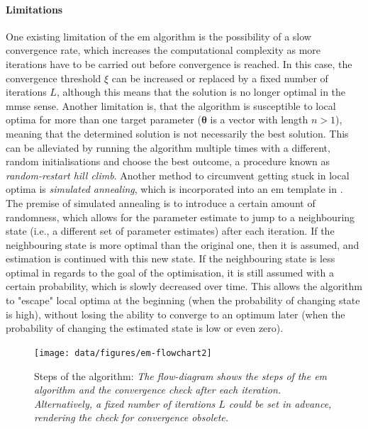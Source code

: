 \paragraph{Limitations}
One existing limitation of the \gls{em} algorithm is the possibility of a slow convergence rate, which increases the computational complexity as more iterations have to be carried out before convergence is reached. In this case, the convergence threshold $\xi$ can be increased or replaced by a fixed number of iterations $L$, although this means that the solution is no longer optimal in the \gls{mmse} sense. Another limitation is, that the algorithm is susceptible to local optima for more than one target parameter ($\bm\theta$ is a vector with length $n>1$), meaning that the determined solution is not necessarily the best solution. This can be alleviated by running the algorithm multiple times with a different, random initialisations and choose the best outcome, a procedure known as \textit{random-restart hill climb}. Another method to circumvent getting stuck in local optima is \textit{simulated annealing}, which is incorporated into an \gls{em} template in \cite{Guo2007}. The premise of simulated annealing is to introduce a certain amount of randomness, which allows for the parameter estimate to jump to a neighbouring state (i.e., a different set of parameter estimates) after each iteration. If the neighbouring state is more optimal than the original one, then it is assumed, and estimation is continued with this new state. If the neighbouring state is less optimal in regards to the goal of the optimisation, it is still assumed with a certain probability, which is slowly decreased over time. This allows the algorithm to "escape" local optima at the beginning (when the probability of changing state is high), without losing the ability to converge to an optimum later (when the probability of changing the estimated state is low or even zero).

\begin{figure}[!bh]
    \texttt{[image: data/figures/em-flowchart2]}
    \caption[Steps of the  algorithm]{Steps of the  algorithm: \itshape The flow-diagram shows the steps of the \gls{em} algorithm and the convergence check after each iteration. Alternatively, a fixed number of iterations $L$ could be set in advance, rendering the check for convergence obsolete.}
\end{figure}




